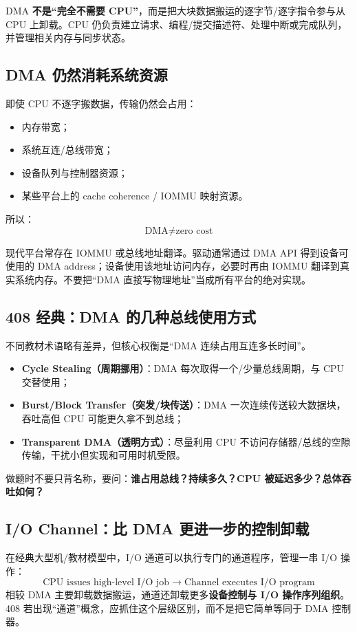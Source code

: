 \documentclass[11pt,a4paper]{ctexart}
\newcommand{\kw}[1]{\textbf{#1}}
\newcommand{\arr}{\;\longrightarrow\;}
\begin{document}
\begin{statebox}
DMA \kw{不是“完全不需要 CPU”}，而是把大块数据搬运的逐字节/逐字指令参与从 CPU 上卸载。CPU 仍负责建立请求、编程/提交描述符、处理中断或完成队列，并管理相关内存与同步状态。
\end{statebox}

\subsection{DMA 仍然消耗系统资源}
即使 CPU 不逐字搬数据，传输仍然会占用：
\begin{itemize}
  \item 内存带宽；
  \item 系统互连/总线带宽；
  \item 设备队列与控制器资源；
  \item 某些平台上的 cache coherence / IOMMU 映射资源。
\end{itemize}
所以：
\[
\boxed{\text{DMA}\neq\text{zero cost}}
\]

\begin{eng}
现代平台常存在 IOMMU 或总线地址翻译。驱动通常通过 DMA API 得到设备可使用的 DMA address；设备使用该地址访问内存，必要时再由 IOMMU 翻译到真实系统内存。不要把“DMA 直接写物理地址”当成所有平台的绝对实现。
\end{eng}

\subsection{408 经典：DMA 的几种总线使用方式}
不同教材术语略有差异，但核心权衡是“DMA 连续占用互连多长时间”。
\begin{itemize}
  \item \kw{Cycle Stealing（周期挪用）}：DMA 每次取得一个/少量总线周期，与 CPU 交替使用；
  \item \kw{Burst/Block Transfer（突发/块传送）}：DMA 一次连续传送较大数据块，吞吐高但 CPU 可能更久拿不到总线；
  \item \kw{Transparent DMA（透明方式）}：尽量利用 CPU 不访问存储器/总线的空隙传输，干扰小但实现和可用时机受限。
\end{itemize}
做题时不要只背名称，要问：\kw{谁占用总线？持续多久？CPU 被延迟多少？总体吞吐如何？}

\subsection{I/O Channel：比 DMA 更进一步的控制卸载}
在经典大型机/教材模型中，I/O 通道可以执行专门的通道程序，管理一串 I/O 操作：
\[
\boxed{\text{CPU issues high-level I/O job}\arr\text{Channel executes I/O program}}
\]
相较 DMA 主要卸载数据搬运，通道还卸载更多\kw{设备控制与 I/O 操作序列组织}。408 若出现“通道”概念，应抓住这个层级区别，而不是把它简单等同于 DMA 控制器。
\end{document}
